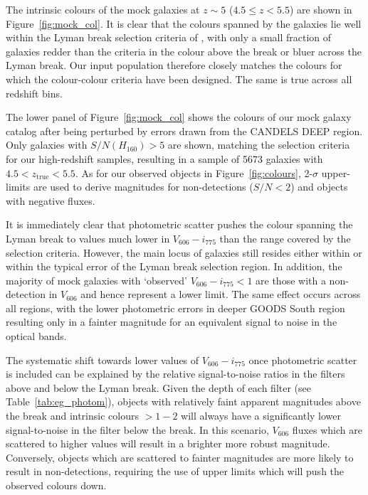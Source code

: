 The intrinsic colours of the mock galaxies at $z \sim 5$ ($4.5 \leq z < 5.5$) are shown in Figure~\ref{fig:mock_col}. It is clear that the colours spanned by the galaxies lie well within the Lyman break selection criteria of \citet{2007ApJ...670..928B}, with only a small fraction of galaxies redder than the criteria in the colour above the break or bluer across the Lyman break. Our input population therefore closely matches the colours for which the colour-colour criteria have been designed. The same is true across all redshift bins. 

The lower panel of Figure~\ref{fig:mock_col} shows the colours of our mock galaxy catalog after being perturbed by errors drawn from the CANDELS DEEP region. Only galaxies with $S/N(H_{160}) > 5$ are shown, matching the selection criteria for our high-redshift samples, resulting in a sample of 5673 galaxies with $4.5 < z_{\text{true}} < 5.5$. As for our observed objects in Figure~\ref{fig:colours}, 2-$\sigma$ upper-limits are used to derive magnitudes for non-detections ($S/N < 2$) and objects with negative fluxes.  

It is immediately clear that photometric scatter pushes the colour spanning the Lyman break to values much lower in $V_{606} - i_{775}$ than the range covered by the selection criteria. However, the main locus of galaxies still resides either within or within the typical error of the Lyman break selection region. In addition, the majority of mock galaxies with `observed' $V_{606} - i_{775} < 1$ are those with a non-detection in $V_{606}$ and hence represent a lower limit. The same effect occurs across all regions, with the lower photometric errors in deeper GOODS South region resulting only in a fainter magnitude for an equivalent signal to noise in the optical bands. 

The systematic shift towards lower values of $V_{606} - i_{775}$ once photometric scatter is included can be explained by the relative signal-to-noise ratios in the filters above and below the Lyman break. Given the depth of each filter (see Table~\ref{tab:eg_photom}), objects with relatively faint apparent magnitudes above the break and intrinsic colours $> 1-2$ will always have a significantly lower signal-to-noise in the filter below the break. In this scenario, $V_{606}$ fluxes which are scattered to higher values will result in a brighter more robust magnitude. Conversely, objects which are scattered to fainter magnitudes are more likely to result in non-detections, requiring the use of upper limits which will push the observed colours down.

